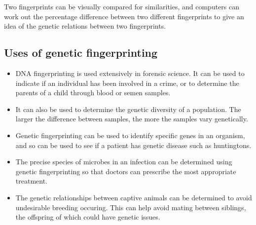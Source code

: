 \documentclass{article}
\begin{document}
Two fingerprints can be visually compared for similarities, and computers can
work out the percentage difference between two different fingerprints to give an
idea of the genetic relations between two fingerprints.

\subsection*{Uses of genetic fingerprinting}

\begin{itemize}

	\item DNA fingerprinting is used extensively in forensic science. It can be
	used to indicate if an individual has been involved in a crime, or to
	determine the parents of a child through blood or semen samples.

	\item It can also be used to determine the genetic diversity of a
	population. The larger the difference between samples, the more the samples
	vary genetically.

	\item Genetic fingerprinting can be used to identify specific genes in an
	organism, and so can be used to see if a patient has genetic disease such as
	huntingtons. 

	\item The precise species of microbes in an infection can be determined
	using genetic fingerprinting so that doctors can prescribe the most
	appropriate treatment.

	\item The genetic relationships between captive animals can be determined to
	avoid undesirable breeding occuring. This can help avoid mating between
	siblings, the offspring of which could have genetic issues.

\end{itemize}
\end{document}
